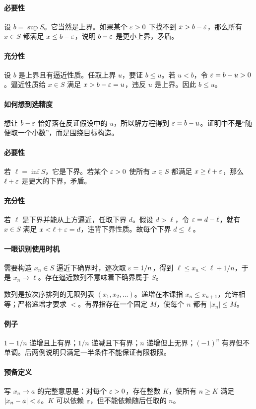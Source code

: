 \paragraph{必要性}设 $b=\sup S$。它当然是上界。如果某个 $\varepsilon>0$ 下找不到 $x>b-\varepsilon$，那么所有 $x\in S$ 都满足 $x\le b-\varepsilon$，说明 $b-\varepsilon$ 是更小上界，矛盾。
\paragraph{充分性}设 $b$ 是上界且有逼近性质。任取上界 $u$，要证 $b\le u$。若 $u<b$，令 $\varepsilon=b-u>0$。逼近性质给 $x\in S$ 满足 $x>b-\varepsilon=u$，违反 $u$ 是上界。因此 $b\le u$。
\paragraph{如何想到选精度}想让 $b-\varepsilon$ 恰好落在反证假设中的 $u$，所以解方程得到 $\varepsilon=b-u$。证明中不是“随便取一个小数”，而是围绕目标构造。

\paragraph{必要性}若 $\ell=\inf S$，它是下界。若某个 $\varepsilon>0$ 使所有 $x\in S$ 都满足 $x\ge\ell+\varepsilon$，那么 $\ell+\varepsilon$ 是更大的下界，矛盾。
\paragraph{充分性}若 $\ell$ 是下界并能从上方逼近，任取下界 $d$。假设 $d>\ell$，令 $\varepsilon=d-\ell$，就有 $x\in S$ 满足 $x<\ell+\varepsilon=d$，违背下界性质。故每个下界 $d\le\ell$。
\paragraph{一眼识别使用时机}需要构造 $x_n\in S$ 逼近下确界时，逐次取 $\varepsilon=1/n$，得到 $\ell\le x_n<\ell+1/n$，于是 $x_n\to\ell$。存在逼近数列不意味着下确界属于 $S$。

数列是按次序排列的无限列表 $(x_1,x_2,\ldots)$。递增在本课指 $x_n\le x_{n+1}$，允许相等；严格递增才要求 $<$。有界指存在一个固定 $M$，使每个 $n$ 都有 $|x_n|\le M$。
\paragraph{例子}$1-1/n$ 递增且上有界；$1/n$ 递减且下有界；$n$ 递增但上无界；$(-1)^n$ 有界但不单调。后两例说明只满足一半条件不能保证有限极限。
\paragraph{预备定义}写 $x_n\to a$ 的完整意思是：对每个 $\varepsilon>0$，存在整数 $K$，使所有 $n\ge K$ 满足 $|x_n-a|<\varepsilon$。$K$ 可以依赖 $\varepsilon$，但不能依赖随后任取的 $n$。

